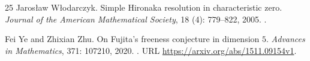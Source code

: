 \begin{thebibliography}{25}
Jaros{\l}aw W{\l}odarczyk.
\newblock Simple {Hironaka} resolution in characteristic zero.
\newblock \emph{Journal of the American Mathematical Society}, 18 (4): 779--822, 2005.
\newblock {}.

Fei Ye and Zhixian Zhu.
\newblock On {Fujita}'s freeness conjecture in dimension $5$.
\newblock \emph{Advances in Mathematics}, 371: 107210, 2020.
\newblock {}.
\newblock URL \url{https://arxiv.org/abs/1511.09154v1}.

\end{thebibliography}
